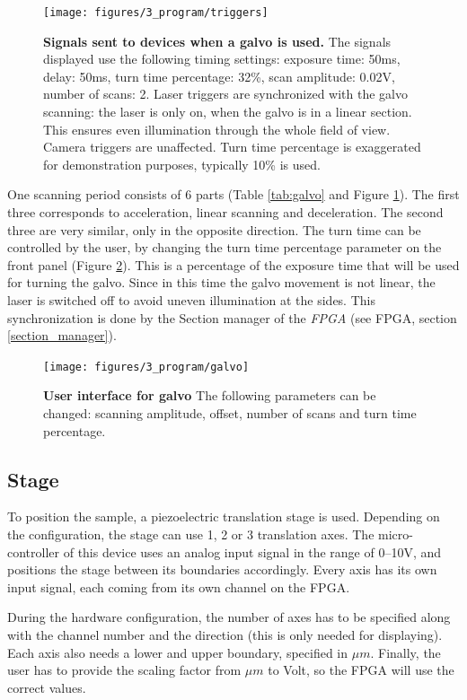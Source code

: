 \documentclass{tdk_style}
\begin{document}
\begin{figure}[phtb]
	\centering
	\texttt{[image: figures/3\_program/triggers]}
	\caption{\textbf{Signals sent to devices when a galvo is used.} The signals displayed use the following timing settings: exposure time: 50ms, delay: 50ms, turn time percentage: 32\%, scan amplitude: 0.02V, number of scans: 2. Laser triggers are synchronized with the galvo scanning: the laser is only on, when the galvo is in a linear section. This ensures even illumination through the whole field of view. Camera triggers are unaffected. Turn time percentage is exaggerated for demonstration purposes, typically  10\% is used.}
	\label{fig:triggers_galvo}
\end{figure}

One scanning period consists of 6 parts (Table \ref{tab:galvo} and Figure \ref{fig:triggers_galvo}). The first three corresponds to acceleration, linear scanning and deceleration. The second three are very similar, only in the opposite direction. The turn time can be controlled by the user, by changing the turn time percentage parameter on the front panel (Figure \ref{fig:ui_galvo}). This is a percentage of the exposure time that will be used for turning the galvo. Since in this time the galvo movement is not linear, the laser is switched off to avoid uneven illumination at the sides. This synchronization is done by the Section manager of the \emph{FPGA} (see FPGA, section \ref{section_manager}).

\begin{figure}[htbp]
	\centering
	\texttt{[image: figures/3\_program/galvo]}
	\caption{\textbf{User interface for galvo} The following parameters can be changed: scanning amplitude, offset, number of scans and turn time percentage.}
	\label{fig:ui_galvo}
\end{figure}

\subsection{Stage}
To position the sample, a piezoelectric translation stage is used. Depending on the configuration, the stage can use 1, 2 or 3 translation axes. The micro-controller of this device uses an analog input signal in the range of 0--10V, and positions the stage between its boundaries accordingly. Every axis has its own input signal, each coming from its own channel on the FPGA.

During the hardware configuration, the number of axes has to be specified along with the channel number and the direction (this is only needed for displaying). Each axis also needs a lower and upper boundary, specified in $\mu m$. Finally, the user has to provide the scaling factor from $\mu m$ to Volt, so the FPGA will use the correct values.
\end{document}
